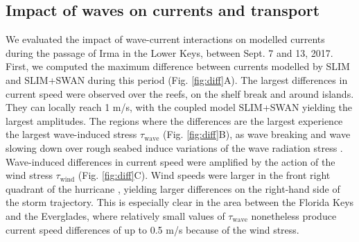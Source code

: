 \documentclass[preprint,12pt,authoryear]{elsarticle}
\begin{document}
\subsection{Impact of waves on currents and transport}

We evaluated the impact of wave-current interactions on modelled currents during the passage of Irma in the Lower Keys, between Sept. 7 and 13, 2017. First, we computed the maximum difference between currents modelled by SLIM and SLIM+SWAN during this period (Fig. \ref{fig:diff}A). The largest differences in current speed were observed over the reefs, on the shelf break and around islands. They can locally reach 1 m/s, with the coupled model SLIM+SWAN yielding the largest amplitudes. The regions where the differences are the largest experience the largest wave-induced stress {\boldmath$\tau$}$_\text{wave}$ (Fig. \ref{fig:diff}B), as wave breaking and wave slowing down over rough seabed induce variations of the wave radiation stress \citep{longuet1964radiation}. Wave-induced differences in current speed were amplified by the action of the wind stress {\boldmath$\tau$}$_\text{wind}$ (Fig. \ref{fig:diff}C). Wind speeds were larger in the front right quadrant of the hurricane \citep{zedler2009ocean}, yielding larger differences on the right-hand side of the storm trajectory. This is especially clear in the area between the Florida Keys and the Everglades, where relatively small values of {\boldmath$\tau$}$_\text{wave}$ nonetheless produce current speed differences of up to 0.5 m/s because of the wind stress.
\end{document}
